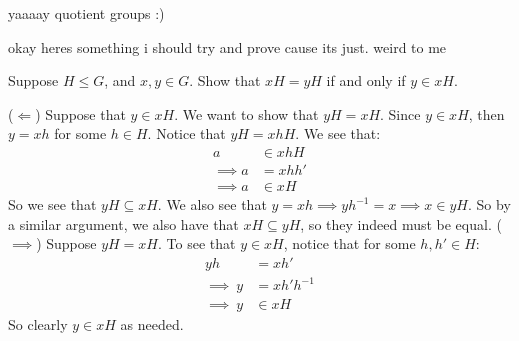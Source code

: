\newpage
yaaaay quotient groups :)

okay heres something i should try and prove cause its just. weird to me
\begin{lm}
    Suppose $ H \leq G $, and $ x, y \in G $. \vsp
    Show that $ xH = yH $ if and only if $ y \in xH $.
\end{lm}

\begin{pf}
    ($ \Longleftarrow $) Suppose that $ y \in xH $.
    We want to show that $ yH = xH $. \vsp
    Since $ y \in xH $, then $ y = xh $ for some $ h \in H $.
    Notice that $ yH = xhH $. We see that:
    \begin{align*}
        a & \in xhH \\
        \implies a & = xhh' \\
        \implies a & \in xH
    \end{align*}
    So we see that $ yH \subseteq xH $.
    We also see that $ y = xh \implies yh^{-1} = x \implies x \in yH $.
    So by a similar argument, we also have that $ xH \subseteq yH $,
    so they indeed must be equal. \vsp
    ($ \implies $) Suppose $ yH = xH $.
    To see that $ y \in xH $, notice that for some $ h, h' \in H $:
    \begin{align*}
        yh & = xh' \\
        \implies \ y & = xh'h^{-1} \\
        \implies \ y & \in xH
    \end{align*}
    So clearly $ y \in xH $ as needed.
\end{pf}
